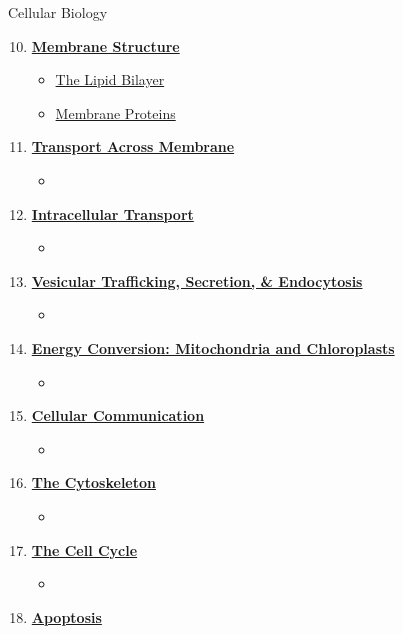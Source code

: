\documentclass[12pt,letterpaper]{article}
\begin{document}
\begin{chapbox}{Cellular Biology}{ 
\begin{enumerate}[font=\bfseries, wide]
    \setcounter{enumi}{9}
    \item \hyperlink{10}{\textbf{Membrane Structure}}
    \begin{itemize}
        \item \hyperlink{10.1a}{The Lipid Bilayer}
        \item \hyperlink{10.2a}{Membrane Proteins}
    \end{itemize}
    \item \hyperlink{11}{\textbf{Transport Across Membrane}}
    \begin{itemize}
        \item
    \end{itemize}
    \item \hyperlink{12}{\textbf{Intracellular Transport}}
    \begin{itemize}
        \item 
    \end{itemize}
    \item \hyperlink{13}{\textbf{Vesicular Trafficking, Secretion, \& Endocytosis}}
    \begin{itemize}
        \item
    \end{itemize}
    \item \hyperlink{14}{\textbf{Energy Conversion: Mitochondria and Chloroplasts}}
    \begin{itemize}
        \item 
    \end{itemize}
    \item \hyperlink{15}{\textbf{Cellular Communication}}
    \begin{itemize}
        \item 
    \end{itemize}
    \item \hyperlink{16}{\textbf{The Cytoskeleton}}
    \begin{itemize}
        \item 
    \end{itemize}
    \item \hyperlink{17}{\textbf{The Cell Cycle}}
    \begin{itemize}
        \item 
    \end{itemize}
    \item \hyperlink{18}{\textbf{Apoptosis}}
    \begin{itemize}

\end{itemize}
\end{enumerate}}
\end{chapbox}
\end{document}
